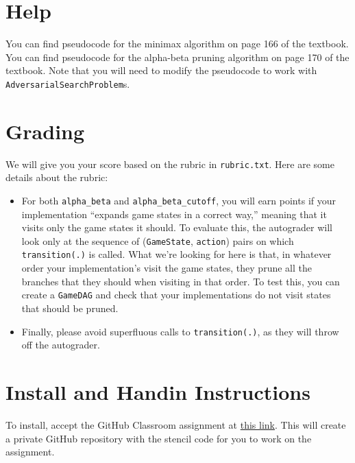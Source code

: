 \documentclass{article}
\begin{document}
\section{Help}
You can find pseudocode for the minimax algorithm on page 166 of the textbook.
You can find pseudocode for the alpha-beta pruning algorithm on page 170 of the textbook.
Note that you will need to modify the pseudocode to work with \verb|AdversarialSearchProblem|s.


\section{Grading}
We will give you your score based on the rubric in \verb|rubric.txt|.
Here are some details about the rubric:

\begin{itemize}
  \item For both \verb|alpha_beta| and \verb|alpha_beta_cutoff|, you will earn points if your implementation ``expands game states in a correct way,'' meaning that it visits only the game states it should.
  To evaluate this, the autograder will look only at the sequence of (\verb|GameState|, \verb|action|) pairs on which \verb|transition(.)| is called.
  What we're looking for here is that, in whatever order your implementation's visit the game states, they prune all the branches that they should when visiting in that order.
  To test this, you can create a \verb|GameDAG| and check that your implementations do not visit states that should be pruned.

  \item Finally, please avoid superfluous calls to \verb|transition(.)|, as they will throw off the autograder.
\end{itemize}


\section{Install and Handin Instructions}
To install, accept the GitHub Classroom assignment at \href{https://classroom.github.com/a/quGayIfM}{this link}. This will
create a private GitHub repository with the stencil code for you to work on the
assignment.
\end{document}
